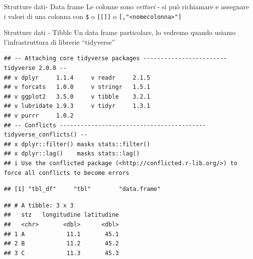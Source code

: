\documentclass[
  ignorenonframetext,
]{beamer}
\newenvironment{Shaded}{\begin{snugshade}}{\end{snugshade}}
\newcommand{\FunctionTok}[1]{\textcolor[rgb]{0.13,0.29,0.53}{\textbf{#1}}}
\newcommand{\NormalTok}[1]{#1}
\newcommand{\OtherTok}[1]{\textcolor[rgb]{0.56,0.35,0.01}{#1}}
\newcommand{\SpecialCharTok}[1]{\textcolor[rgb]{0.81,0.36,0.00}{\textbf{#1}}}
\newcommand{\StringTok}[1]{\textcolor[rgb]{0.31,0.60,0.02}{#1}}
\begin{document}
\begin{frame}[fragile]{Strutture dati- Data frame}
\protect\hypertarget{strutture-dati--data-frame-1}{}
Le colonne sono \emph{vettori} - si può richiamare e assegnare i valori
di una colonna con \texttt{\$} o \texttt{{[}{[}{]}{]}} o
\texttt{{[},"\textless{}nomecolonna\textgreater{}"{]}}

\begin{Shaded}
\end{Shaded}
\end{frame}

\begin{frame}[fragile]{Strutture dati - Tibble}
\protect\hypertarget{strutture-dati---tibble}{}
Un data frame particolare, lo vedremo quando usiamo l'infrastruttura di
librerie ``tidyverse''

\begin{verbatim}
## -- Attaching core tidyverse packages ------------------------ tidyverse 2.0.0 --
## v dplyr     1.1.4     v readr     2.1.5
## v forcats   1.0.0     v stringr   1.5.1
## v ggplot2   3.5.0     v tibble    3.2.1
## v lubridate 1.9.3     v tidyr     1.3.1
## v purrr     1.0.2     
## -- Conflicts ------------------------------------------ tidyverse_conflicts() --
## x dplyr::filter() masks stats::filter()
## x dplyr::lag()    masks stats::lag()
## i Use the conflicted package (<http://conflicted.r-lib.org/>) to force all conflicts to become errors
\end{verbatim}

\begin{verbatim}
## [1] "tbl_df"     "tbl"        "data.frame"
\end{verbatim}

\begin{verbatim}
## # A tibble: 3 x 3
##   stz   longitudine latitudine
##   <chr>       <dbl>      <dbl>
## 1 A            11.1       45.1
## 2 B            11.2       45.2
## 3 C            11.3       45.3
\end{verbatim}
\end{frame}
\end{document}
